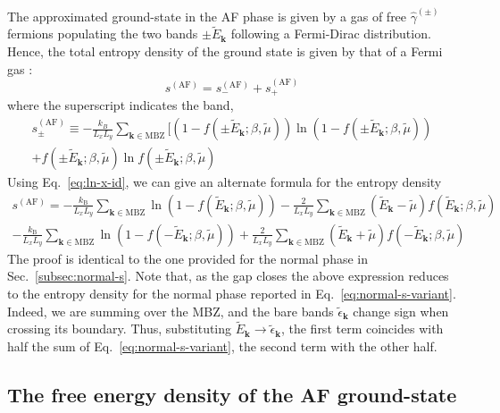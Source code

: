The approximated ground-state in the AF phase is given by a gas of free $\hat \gamma^{(\pm)}$ fermions populating the two bands $\pm \tilde{E}_\mathbf{k}$ following a Fermi-Dirac distribution. Hence, the total entropy density of the ground state is given by that of a Fermi gas \cite{grosso2014solid}:
\[
	s^{(\mathrm{AF})} = s_-^{(\mathrm{AF})} + s_+^{(\mathrm{AF})}
\]
where the superscript indicates the band,
\begin{multline}
	s_\pm^{(\mathrm{AF})} \equiv -\frac{k_B}{L_x L_y} \sum_{\mathbf{k}\in\mathrm{MBZ}} \Big[
	\left(
	1- f( \pm\tilde{E}_\mathbf{k}; \beta,\tilde{\mu})
	\right) \ln \left(
	1- f( \pm\tilde{E}_\mathbf{k}; \beta,\tilde{\mu})
	\right) \\
	+ f(
	\pm\tilde{E}_\mathbf{k}; \beta,\tilde{\mu})
	\ln f( \pm\tilde{E}_\mathbf{k}; \beta,\tilde{\mu}) \label{eq:af-s}
\end{multline}
Using Eq.~\eqref{eq:ln-x-id}, we can give an alternate formula for the entropy density
\begin{multline}
	s^{(\mathrm{AF})} = -\frac{k_\mathrm{B}}{L_x L_y} \sum_{\mathbf{k}\in\mathrm{MBZ}} \ln \left(
	1- f( \tilde{E}_\mathbf{k}; \beta,\tilde{\mu}) \right) - \frac{2}{L_x L_y} \sum_{\mathbf{k}\in\mathrm{MBZ}} (\tilde{E}_\mathbf{k}-\tilde{\mu}) f( \tilde{E}_\mathbf{k}; \beta,\tilde{\mu}) \\
	-\frac{k_\mathrm{B}}{L_x L_y} \sum_{\mathbf{k}\in\mathrm{MBZ}} \ln \left(
	1- f( -\tilde{E}_\mathbf{k}; \beta,\tilde{\mu}) \right) + \frac{2}{L_x L_y} \sum_{\mathbf{k}\in\mathrm{MBZ}} (\tilde{E}_\mathbf{k}+\tilde{\mu}) f( -\tilde{E}_\mathbf{k}; \beta,\tilde{\mu}) \label{eq:af-s-variant}
\end{multline}
The proof is identical to the one provided for the normal phase in Sec.~\ref{subsec:normal-s}. Note that, as the gap closes the above expression reduces to the entropy density for the normal phase reported in Eq.~\eqref{eq:normal-s-variant}. Indeed, we are summing over the MBZ, and the bare bands $\tilde{\epsilon}_\mathbf{k}$ change sign when crossing its boundary. Thus, substituting $\tilde{E}_\mathbf{k} \to \tilde{\epsilon}_\mathbf{k}$, the first term coincides with half the sum of Eq.~\eqref{eq:normal-s-variant}, the second term with the other half.

\subsection{The free energy density of the AF ground-state}\label{subsec:af-f}


